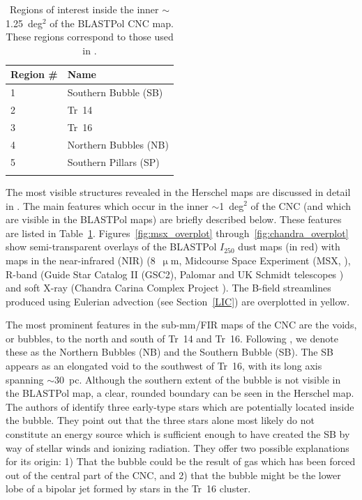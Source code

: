 \begin{table}[!htbp]
\centering
\begin{tabular}{@{}ll@{}}
\dtoprule{}
Region \# & Name \\ \midrule
1 & Southern Bubble (SB) \\
2 & Tr~14 \\
3 & Tr~16 \\
4 & Northern Bubbles (NB) \\
5 & Southern Pillars (SP) \\ \dbottomrule{}
\\
\end{tabular}
\caption[Regions of interest inside the inner  of the BLASTPol CNC map.]{Regions of interest inside the inner $\sim$1.25~deg$^{2}$ of the BLASTPol CNC map. These regions correspond to those used in \citet{preibisch2012herschel}.}
\label{table:regions}
\end{table}

The most visible structures revealed in the Herschel maps are discussed in detail in \citet{preibisch2012herschel}. The main features which occur in the inner $\sim$1~deg$^{2}$ of the CNC (and which are visible in the BLASTPol maps) are briefly described below. These features are listed in Table~\ref{table:regions}. Figures~\ref{fig:msx_overplot} through~\ref{fig:chandra_overplot} show semi-transparent overlays of the BLASTPol $I_{250}$ dust maps (in red) with maps in the near-infrared (NIR) (8~$\upmu$m, Midcourse Space Experiment (MSX, \citet{smith2000large}), R-band (Guide Star Catalog II (GSC2), Palomar and UK Schmidt telescopes \citep{lasker2008second}) and soft X-ray (Chandra Carina Complex Project \citep{townsley2011introduction}). The B-field streamlines produced using Eulerian advection (see Section~\ref{LIC}) are overplotted in yellow.

The most prominent features in the sub-mm/FIR maps of the CNC are the voids, or bubbles, to the north and south of Tr~14 and Tr~16. Following \citet{preibisch2012herschel}, we denote these as the Northern Bubbles (NB) and the Southern Bubble (SB). The SB appears as an elongated void to the southwest of Tr~16, with its long axis spanning $\sim$30~pc. Although the southern extent of the bubble is not visible in the BLASTPol map, a clear, rounded boundary can be seen in the Herschel map. The authors of \citet{preibisch2012herschel} identify three early-type stars which are potentially located inside the bubble. They point out that the three stars alone most likely do not constitute an energy source which is sufficient enough to have created the SB by way of stellar winds and ionizing radiation. They offer two possible explanations for its origin: 1) That the bubble could be the result of gas which has been forced out of the central part of the CNC, and 2) that the bubble might be the lower lobe of a bipolar jet formed by stars in the Tr~16 cluster.

